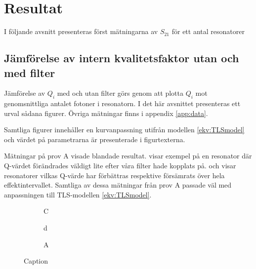 \documentclass[main.tex]{subfiles}
\begin{document}
\chapter{Resultat}
\label{ch:results}
I följande avsnitt presenteras först mätningarna av $S_{21}$ för ett antal resonatorer

\section{Jämförelse av intern kvalitetsfaktor utan och med filter}
Jämförelse av $Q_i$ med och utan filter görs genom att plotta $Q_i$ mot genomsnittliga antalet fotoner i resonatorn. I det här avsnittet presenteras ett urval sådana figurer. Övriga mätningar finns i appendix \ref{app:data}.

Samtliga figurer innehåller en kurvanpassning utifrån modellen \ref{ekv:TLSmodel} och värdet på parametrarna är presenterade i figurtexterna.

Mätningar på prov A visade blandade resultat.  visar exempel på en resonator där Q-värdet förändrades väldigt lite efter våra filter hade kopplats på.  och  visar resonatorer vilkas Q-värde har förbättras respektive försämrats över hela effektintervallet. Samtliga av dessa mätningar från prov A passade väl med anpassningen till TLS-modellen \ref{ekv:TLSmodel}.



\begin{figure}
    \begin{subfigure}{0.5\textwidth}
    \centering
    \setlength{}
    \setlength\figureheight{11em}
    
    \caption{C}
    \end{subfigure}
    \begin{subfigure}{0.5\textwidth}
    \centering
    \setlength{}
    \setlength\figureheight{11em}
    
    \caption{d}
    \end{subfigure}
    \begin{center}
    \begin{subfigure}{0.75\textwidth}
    \centering
    \setlength{}
    \setlength\figureheight{11em}
    
    \caption{A}
    \end{subfigure}
    \end{center}
    \caption{Caption}
    \label{fig:my_label}
\end{figure}
\end{document}
